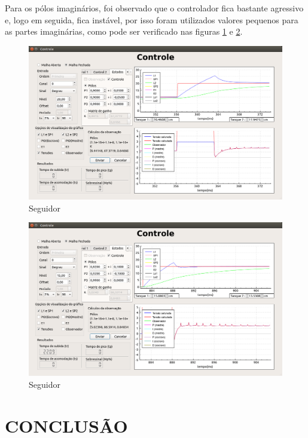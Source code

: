 \documentclass[a4paper,12pt]{article}
\begin{document}
\hspace{4ex}Para os pólos imaginários, foi observado que o controlador fica bastante agressivo e, logo em seguida, fica instável, por isso foram utilizados valores pequenos para as partes imaginárias, como pode ser verificado nas figuras \ref{img5} e \ref{img6}.
\begin{figure}[!h]
\centering
\includegraphics[width=13cm]{FotosSeguidor/PolosComplexos}
\caption{Seguidor}
\label{img5}
\end{figure}
\begin{figure}[!h]
\centering
\includegraphics[width=13cm]{FotosSeguidor/PolosComplexos2}
\caption{Seguidor}
\label{img6}
\end{figure}

\newpage

\newpage
\thispagestyle{main}

\section{CONCLUSÃO}
\end{document}
